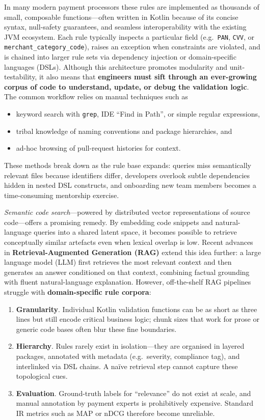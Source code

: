 In many modern payment processors these rules are implemented as thousands of small, composable functions—often written in Kotlin because of its concise syntax, null-safety guarantees, and seamless interoperability with the existing JVM ecosystem.  
Each rule typically inspects a particular field (e.g.\ \texttt{PAN}, \texttt{CVV}, or \texttt{merchant\_category\_code}), raises an exception when constraints are violated, and is chained into larger rule sets via dependency injection or domain-specific languages (DSLs).  
Although this architecture promotes modularity and unit-testability, it also means that \textbf{engineers must sift through an ever-growing corpus of code to understand, update, or debug the validation logic}.  
The common workflow relies on manual techniques such as
\begin{itemize}
    \item keyword search with \texttt{grep}, IDE “Find in Path”, or simple regular expressions,
    \item tribal knowledge of naming conventions and package hierarchies, and
    \item ad-hoc browsing of pull-request histories for context.
\end{itemize}
These methods break down as the rule base expands: queries miss semantically relevant files because identifiers differ, developers overlook subtle dependencies hidden in nested DSL constructs, and onboarding new team members becomes a time-consuming mentorship exercise.

\emph{Semantic code search}—powered by distributed vector representations of source code—offers a promising remedy.  
By embedding code snippets and natural-language queries into a shared latent space, it becomes possible to retrieve conceptually similar artefacts even when lexical overlap is low.  
Recent advances in \textbf{Retrieval-Augmented Generation (RAG)} extend this idea further: a large language model (LLM) first retrieves the most relevant context and then generates an answer conditioned on that context, combining factual grounding with fluent natural-language explanation.  
However, off-the-shelf RAG pipelines struggle with \textbf{domain-specific rule corpora}:

\begin{enumerate}
    \item \textbf{Granularity}. Individual Kotlin validation functions can be as short as three lines but still encode critical business logic; chunk sizes that work for prose or generic code bases often blur these fine boundaries.
    \item \textbf{Hierarchy}. Rules rarely exist in isolation—they are organised in layered packages, annotated with metadata (e.g.\ severity, compliance tag), and interlinked via DSL chains. A naïve retrieval step cannot capture these topological cues.
    \item \textbf{Evaluation}. Ground-truth labels for “relevance” do not exist at scale, and manual annotation by payment experts is prohibitively expensive. Standard IR metrics such as MAP or nDCG therefore become unreliable.
\end{enumerate}

